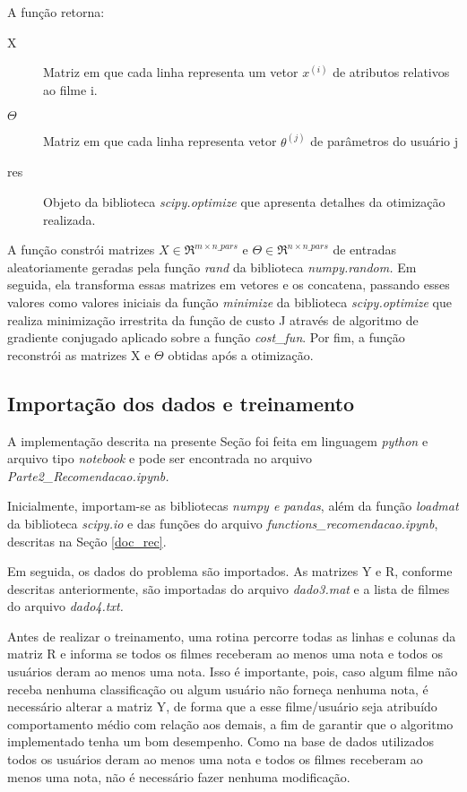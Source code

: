 \documentclass[12pt]{article}
\begin{document}
A função retorna:

\begin{description}
\item[X] Matriz  em que cada linha representa um vetor $x^{(i)}$ de atributos relativos ao filme i.
\item[$\Theta$] Matriz em que cada linha representa vetor $\theta^{(j)}$ de parâmetros do usuário j
\item[res] Objeto da biblioteca \textit{scipy.optimize} que apresenta detalhes da otimização realizada.
\end{description}

A função constrói matrizes $X \in \Re^{m \times n\_pars}$ e $\Theta \in \Re^{n \times n\_pars}$ de entradas aleatoriamente geradas pela função \textit{rand} da biblioteca \textit{numpy.random.} Em seguida, ela transforma essas matrizes em vetores e os concatena, passando esses valores como valores iniciais da função \textit{minimize} da biblioteca \textit{scipy.optimize} que realiza minimização irrestrita da função de custo J através de algoritmo de gradiente conjugado aplicado sobre a função \textit{cost\_fun}. Por fim, a função reconstrói as matrizes X e $\Theta$ obtidas após a otimização.

\subsection{Importação dos dados e treinamento} \label{treino_rec}
A implementação descrita na presente Seção foi feita em linguagem \textit{python} e arquivo tipo \textit{notebook} e pode ser encontrada no arquivo \textit{Parte2\_Recomendacao.ipynb.}

Inicialmente, importam-se as bibliotecas \textit{numpy e pandas}, além da função \textit{loadmat} da biblioteca \textit{scipy.io} e das funções do arquivo \textit{functions\_recomendacao.ipynb}, descritas na Seção \ref{doc_rec}.

Em seguida, os dados do problema são importados. As matrizes Y e R, conforme descritas anteriormente, são importadas do arquivo \textit{dado3.mat} e a lista de filmes do arquivo \textit{dado4.txt.}

Antes de realizar o treinamento, uma rotina percorre todas as linhas e colunas da matriz R e informa se todos os filmes receberam ao menos uma nota e todos os usuários deram ao menos uma nota. Isso é importante, pois, caso algum filme não receba nenhuma classificação ou algum usuário não forneça nenhuma nota, é necessário alterar a matriz Y, de forma que a esse filme/usuário seja atribuído comportamento médio com relação aos demais, a fim de garantir que o algoritmo implementado tenha um bom desempenho. Como na base de dados utilizados todos os usuários deram ao menos uma nota e todos os filmes receberam ao menos uma nota, não é necessário fazer nenhuma modificação.
\end{document}
